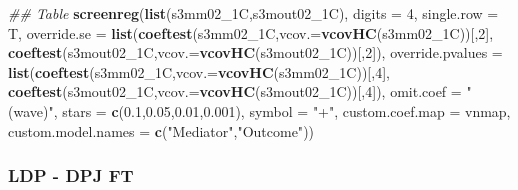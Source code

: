 \documentclass[
]{article}
\newenvironment{Shaded}{\begin{snugshade}}{\end{snugshade}}
\newcommand{\CommentTok}[1]{\textcolor[rgb]{0.56,0.35,0.01}{\textit{#1}}}
\newcommand{\DataTypeTok}[1]{\textcolor[rgb]{0.13,0.29,0.53}{#1}}
\newcommand{\DecValTok}[1]{\textcolor[rgb]{0.00,0.00,0.81}{#1}}
\newcommand{\FloatTok}[1]{\textcolor[rgb]{0.00,0.00,0.81}{#1}}
\newcommand{\KeywordTok}[1]{\textcolor[rgb]{0.13,0.29,0.53}{\textbf{#1}}}
\newcommand{\NormalTok}[1]{#1}
\newcommand{\StringTok}[1]{\textcolor[rgb]{0.31,0.60,0.02}{#1}}
\begin{document}
\begin{Shaded}
\begin{Highlighting}[]
\CommentTok{## Table}
\KeywordTok{screenreg}\NormalTok{(}\KeywordTok{list}\NormalTok{(s3mm02_1C,s3mout02_1C), }\DataTypeTok{digits =} \DecValTok{4}\NormalTok{, }\DataTypeTok{single.row =}\NormalTok{ T,}
          \DataTypeTok{override.se =} \KeywordTok{list}\NormalTok{(}\KeywordTok{coeftest}\NormalTok{(s3mm02_1C,}\DataTypeTok{vcov.=}\KeywordTok{vcovHC}\NormalTok{(s3mm02_1C))[,}\DecValTok{2}\NormalTok{],}
                             \KeywordTok{coeftest}\NormalTok{(s3mout02_1C,}\DataTypeTok{vcov.=}\KeywordTok{vcovHC}\NormalTok{(s3mout02_1C))[,}\DecValTok{2}\NormalTok{]),}
          \DataTypeTok{override.pvalues =} \KeywordTok{list}\NormalTok{(}\KeywordTok{coeftest}\NormalTok{(s3mm02_1C,}\DataTypeTok{vcov.=}\KeywordTok{vcovHC}\NormalTok{(s3mm02_1C))[,}\DecValTok{4}\NormalTok{],}
                                  \KeywordTok{coeftest}\NormalTok{(s3mout02_1C,}\DataTypeTok{vcov.=}\KeywordTok{vcovHC}\NormalTok{(s3mout02_1C))[,}\DecValTok{4}\NormalTok{]),}
          \DataTypeTok{omit.coef =} \StringTok{"(wave)"}\NormalTok{, }\DataTypeTok{stars =} \KeywordTok{c}\NormalTok{(}\FloatTok{0.1}\NormalTok{,}\FloatTok{0.05}\NormalTok{,}\FloatTok{0.01}\NormalTok{,}\FloatTok{0.001}\NormalTok{), }\DataTypeTok{symbol =} \StringTok{"+"}\NormalTok{,}
          \DataTypeTok{custom.coef.map =}\NormalTok{ vnmap, }
          \DataTypeTok{custom.model.names =} \KeywordTok{c}\NormalTok{(}\StringTok{"Mediator"}\NormalTok{,}\StringTok{"Outcome"}\NormalTok{))}
\end{Highlighting}
\end{Shaded}

\hypertarget{ldp---dpj-ft}{%
\subsubsection{LDP - DPJ FT}\label{ldp---dpj-ft}}
\end{document}
